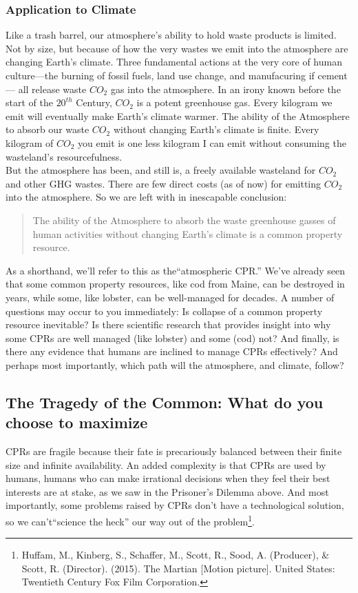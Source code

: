 \subsubsection{Application to Climate}
Like a trash barrel, our atmosphere's ability to hold waste products is limited. Not by size, but because of how the very wastes we emit into the atmosphere are changing Earth's climate. Three fundamental actions at the very core of human culture---the burning of fossil fuels, land use change, and manufacuring if cement--- all release waste $CO_{2}$ gas into the atmosphere. In an irony known before the start of the $20^{th}$ Century, $CO_{2}$ is a potent greenhouse gas. Every kilogram we emit will eventually make Earth's climate warmer. The ability of the Atmosphere to absorb our waste $CO_{2}$ without changing Earth's climate is finite. Every kilogram of $CO_{2}$ you emit is one less kilogram I can emit without consuming the wasteland's resourcefulness.\\

But the atmosphere has been, and still is, a freely available wasteland for $CO_{2}$ and other GHG wastes. There are few direct costs (as of now) for emitting $CO_{2}$ into the atmosphere. So we are left with in inescapable conclusion:
\begin{quote}
	The ability of the Atmosphere to absorb the waste greenhouse gasses of human activities without changing Earth's climate is a common property resource.
\end{quote}
As a shorthand, we'll refer to this as the``atmospheric CPR.'' We've already seen that some common property resources, like cod from Maine, can be destroyed in years, while some, like lobster, can be well-managed for decades. A number of questions may occur to you immediately: Is collapse of a common property resource inevitable? Is there scientific research that provides insight into why some CPRs are well managed (like lobster) and some (cod) not? And finally, is there any evidence that humans are inclined to manage CPRs effectively? And perhaps most importantly, which path will the atmosphere, and climate, follow?\\
   
\subsection{The Tragedy of the Common: What do you choose to maximize}\label{collective_action}
CPRs are fragile because their fate is precariously balanced between their finite size and infinite availability. An added complexity is that CPRs are used by humans, humans who can make irrational decisions when they feel their best interests are at stake, as we saw in the Prisoner's Dilemma above. And most importantly, some problems raised by CPRs don't have a technological solution, so we can't``science the heck'' our way out of the problem\footnote{Huffam,  M., Kinberg, S., Schaffer, M., Scott, R., Sood, A. (Producer), \& Scott, R. (Director). (2015). The  Martian [Motion picture]. United States:  Twentieth Century Fox Film Corporation.}.\\
 
